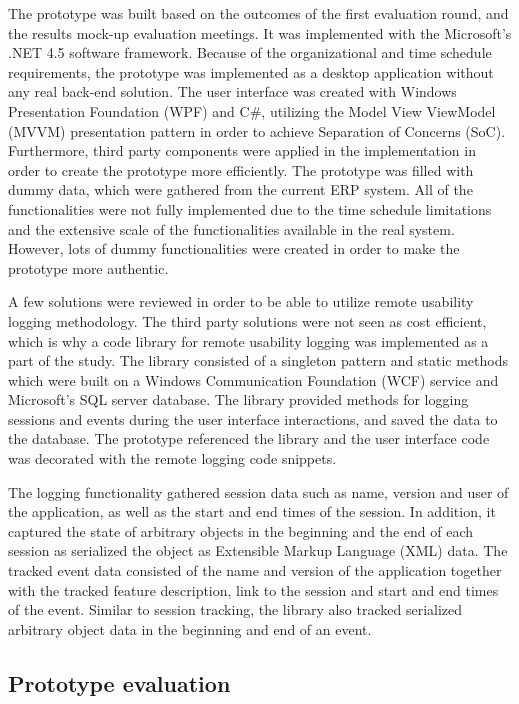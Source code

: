 \documentclass[12pt,a4paper,oneside,pdftex]{report}
\begin{document}
The prototype was built based on the outcomes of the first evaluation round, and the results mock-up evaluation meetings. It was implemented with the Microsoft's .NET 4.5 software framework. Because of the organizational and time schedule requirements, the prototype was implemented as a desktop application without any real back-end solution. The user interface was created with Windows Presentation Foundation (WPF) and C\#, utilizing the Model View ViewModel (MVVM) presentation pattern in order to achieve Separation of Concerns (SoC). \citep{RefWorks:37} Furthermore, third party components were applied in the implementation in order to create the prototype more efficiently. The prototype was filled with dummy data, which were gathered from the current ERP system. All of the functionalities were not fully implemented due to the time schedule limitations and the extensive scale of the functionalities available in the real system. However, lots of dummy functionalities were created in order to make the prototype more authentic.

A few solutions were reviewed in order to be able to utilize remote usability logging methodology. The third party solutions were not seen as cost efficient, which is why a code library for remote usability logging was implemented as a part of the study. The library consisted of a singleton pattern and static methods which were built on a Windows Communication Foundation (WCF) service and Microsoft's SQL server database. The library provided methods for logging sessions and events during the user interface interactions, and saved the data to the database. The prototype referenced the library and the user interface code was  decorated with the remote logging code snippets.

The logging functionality gathered session data such as name, version and user of the application, as well as the start and end times of the session. In addition, it captured the state of arbitrary objects in the beginning and the end of each session as serialized the object as Extensible Markup Language (XML) data. The tracked event data consisted of the name and version of the application together with the tracked feature description, link to the session and start and end times of the event. Similar to session tracking, the library also tracked serialized arbitrary object data in the beginning and end of an event.

	  
\subsection{Prototype evaluation}
\end{document}
